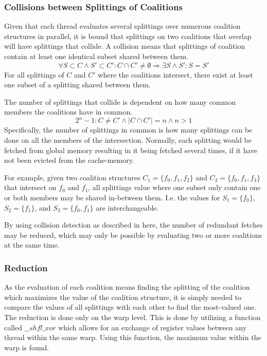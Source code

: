 \documentclass[a4paper, 12pt]{report}
\begin{document}
\subsubsection{Collisions between Splittings of Coalitions} \label{sectionsplit}
Given that each thread evaluates several splittings over numerous coalition
structures in parallel, 
it is bound that splittings on two coalitions that overlap will have splittings
that collide.
A collision means that splittings of coalition contain at least one identical
subset shared between them.
\begin{displaymath}\forall S\subset C \wedge S' \subset C' : C \cap C' \neq
\emptyset \Rightarrow \exists S \wedge S' : S = S'\end{displaymath}
For all splittings of $C$ and $C'$ where the coalitions intersect, there exist
at least one subset of a splitting shared between them.

The number of splittings that collide is dependent on how many common members
the coalitions have in common.
\begin{displaymath}2^{n}-1:C\neq C'\wedge |C \cap C'| = n \wedge n > 1
\end{displaymath}
Specifically, the number of splittings in common is how many splittings
can be done on all the members of the intersection. Normally, each splitting
would be fetched from global memory resulting in it being fetched several times,
if it have not been evicted from the cache-memory.

For example, given two coalition structures $C_1 =\{f_0,f_1,f_2\}$ and $C_2
=\{f_0,f_1,f_3\}$ that intersect on $f_0$ and $f_1$, all splittings value where
one subset only contain one or both members may be shared in-between them. I.e.
the values for $S_1 = \{f_0\}$, $S_2 = \{f_1\}$, and $S_3 = \{f_0,f_1\}$ are
interchangeable.


By using collision detection as described in here, the
number of redundant fetches may be reduced,
which may only be possible by evaluating two or more coalitions at the same
time. 

\subsubsection{Reduction} \label{reduction} %
As the evaluation of each coalition  means finding the splitting  of the
coalition  which maximizes the value of the coalition structure, it is simply
needed to compare the values of all splittings with each other to find the
most-valued one.  The reduction is done only on the warp level.
This is done by utilizing a function
called $\_\_shfl\_xor$ which allows for an exchange of register values between
any thread within the same warp.
Using this function, the maximum value within the warp is found.
\end{document}
